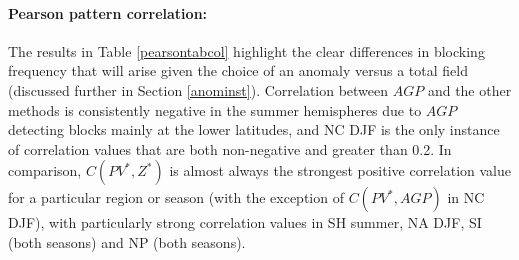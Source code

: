 \documentclass[smallextended]{svjour3}       %
\numberwithin{equation}{section}
\begin{document}
\paragraph{Pearson pattern correlation:} The results in Table \ref{pearsontabcol} highlight the clear differences in blocking frequency that will arise given the choice of an anomaly versus a total field (discussed further in Section \ref{anominst}). {\color{blue}Correlation between $AGP$ and the other methods is consistently negative in the summer hemispheres due to $AGP$ detecting blocks mainly at the lower latitudes, and NC DJF is the only instance of correlation values that are both non-negative and greater than 0.2. }In comparison, $C(PV^*, Z^*)$ is almost always the strongest positive correlation value for a particular region or season (with the exception of $C(PV^*, AGP)$ in NC DJF), with particularly strong correlation values in SH summer, NA DJF, SI (both seasons) and NP (both seasons).

\end{document}

